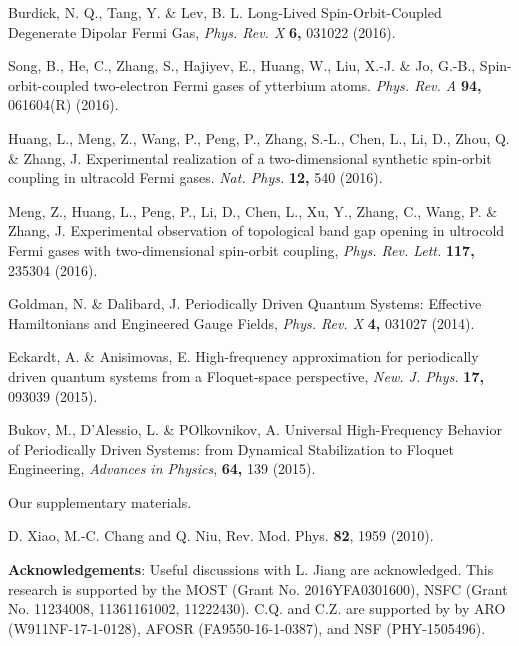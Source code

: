 \documentclass[aps,prl,twocolumn,floatfix,reprint]{revtex4}
\begin{document}
\begin{thebibliography}{99}
 Burdick, N. Q., Tang, Y. \& Lev, B. L. Long-Lived
Spin-Orbit-Coupled Degenerate Dipolar Fermi Gas, \emph{Phys. Rev. X} \textbf{%
6,} 031022 (2016).

 Song, B., He, C., Zhang, S., Hajiyev, E., Huang, W., Liu, X.-J.
\& Jo, G.-B., Spin-orbit-coupled two-electron Fermi gases of ytterbium
atoms. \emph{Phys. Rev. A} \textbf{94,} 061604(R) (2016).

 Huang, L., Meng, Z., Wang, P., Peng, P., Zhang, S.-L.,
Chen, L., Li, D., Zhou, Q. \& Zhang, J. Experimental realization of a
two-dimensional synthetic spin-orbit coupling in ultracold Fermi gases.
\textit{Nat. Phys.} \textbf{12,} 540 (2016).

 Meng, Z., Huang, L., Peng, P., Li, D., Chen, L., Xu, Y.,
Zhang, C., Wang, P. \& Zhang, J. Experimental observation of topological
band gap opening in ultrocold Fermi gases with two-dimensional spin-orbit
coupling, \emph{Phys. Rev. Lett.} \textbf{117,} 235304 (2016).

 Goldman, N. \& Dalibard, J. Periodically Driven
Quantum Systems: Effective Hamiltonians and Engineered Gauge Fields, \emph{%
Phys. Rev. X} \textbf{4,} 031027 (2014).

 Eckardt, A. \& Anisimovas, E. High-frequency
approximation for periodically driven quantum systems from a Floquet-space
perspective, \emph{New. J. Phys.} \textbf{17,} 093039 (2015).

 Bukov, M., D'Alessio, L. \& POlkovnikov, A. Universal
High-Frequency Behavior of Periodically Driven Systems: from Dynamical
Stabilization to Floquet Engineering, \emph{Advances in Physics}, \textbf{64,%
} 139 (2015).

 Our supplementary materials.




 D. Xiao, M.-C. Chang and Q. Niu, Rev. Mod. Phys. \textbf{82},
1959 (2010).

\end{thebibliography}

\textbf{Acknowledgements}: Useful discussions with L. Jiang are
acknowledged. This research is supported by the MOST (Grant No.
2016YFA0301600), NSFC (Grant No. 11234008, 11361161002, 11222430). C.Q. and
C.Z. are supported by by ARO (W911NF-17-1-0128), AFOSR (FA9550-16-1-0387),
and NSF (PHY-1505496).
\end{document}
